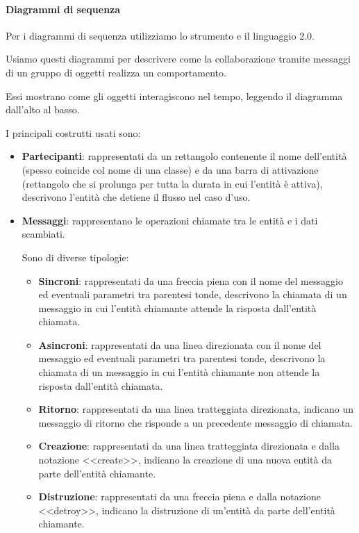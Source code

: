 		\paragraph{Diagrammi di sequenza}\label{PP:Sviluppo:DiagrammiSequenza}
		Per i diagrammi di sequenza utilizziamo lo strumento  e il linguaggio  2.0.\par
        Usiamo questi diagrammi per descrivere come la collaborazione tramite messaggi di un gruppo di oggetti realizza un comportamento.\par
        Essi mostrano come gli oggetti interagiscono nel tempo, leggendo il diagramma dall'alto al basso.\par
        I principali costrutti usati sono:
        \begin{itemize}
            \item \textbf{Partecipanti}: rappresentati da un rettangolo contenente il nome dell'entità (spesso coincide col nome di una classe) e da una barra di attivazione (rettangolo che si prolunga per tutta la durata in cui l'entità è attiva), descrivono l'entità che detiene il flusso nel caso d'uso.
            \item \textbf{Messaggi}: rappresentano le operazioni chiamate tra le entità e i dati scambiati.\par
            Sono di diverse tipologie:
            \begin{itemize}
                \item \textbf{Sincroni}: rappresentati da una freccia piena con il nome del messaggio ed eventuali parametri tra parentesi tonde, descrivono la chiamata di un messaggio in cui l'entità chiamante attende la risposta dall'entità chiamata.
                \item \textbf{Asincroni}: rappresentati da una linea direzionata con il nome del messaggio ed eventuali parametri tra parentesi tonde, descrivono la chiamata di un messaggio in cui l'entità chiamante non attende la risposta dall'entità chiamata.
                \item \textbf{Ritorno}: rappresentati da una linea tratteggiata direzionata, indicano un messaggio di ritorno che risponde a un precedente messaggio di chiamata.
                \item \textbf{Creazione}: rappresentati da una linea tratteggiata direzionata e dalla notazione <<create>>, indicano la creazione di una nuova entità da parte dell'entità chiamante.
                \item \textbf{Distruzione}: rappresentati da una freccia piena e dalla notazione <<detroy>>, indicano la distruzione di un'entità da parte dell'entità chiamante.
            \end{itemize}
        \end{itemize}
